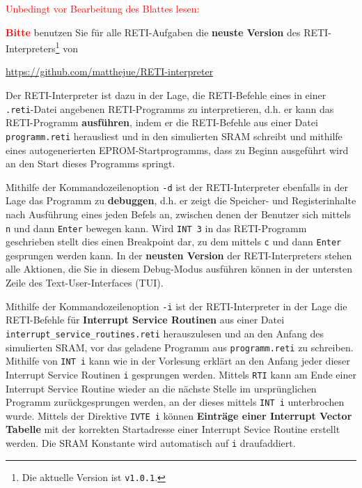 \documentclass{article}
\newenvironment{adjustedminipage}[1]
  {\vspace{0.15cm}\begin{minipage}{#1}}
  {\end{minipage}}
\begin{document}
\textcolor{red}{Unbedingt vor Bearbeitung des Blattes lesen:}

{\LARGE \textbf{\textcolor{red}{Bitte}}} benutzen Sie für alle RETI-Aufgaben die \textbf{neuste Version} des RETI-Interpreters\footnote{Die aktuelle Version ist \texttt{v1.0.1}.} von

\begin{center}
	\begin{adjustedminipage}{0.9\textwidth}
    \url{https://github.com/matthejue/RETI-interpreter}
	\end{adjustedminipage}
\end{center}

Der RETI-Interpreter ist dazu in der Lage, die RETI-Befehle eines in einer \verb|.reti|-Datei angebenen RETI-Programms zu interpretieren, d.h. er kann das RETI-Programm \textbf{ausführen}, indem er die RETI-Befehle aus einer Datei \verb|programm.reti| herausliest und in den simulierten SRAM schreibt und mithilfe eines autogenerierten EPROM-Startprogramms, dass zu Beginn ausgeführt wird an den Start dieses Programms springt.

Mithilfe der Kommandozeilenoption \verb|-d| ist der RETI-Interpreter ebenfalls in der Lage das Programm zu \textbf{debuggen}, d.h. er zeigt die Speicher- und Registerinhalte nach Ausführung eines jeden Befels an, zwischen denen der Benutzer sich mittels \verb|n| und dann \verb|Enter| bewegen kann. Wird \verb|INT 3| in das RETI-Programm geschrieben stellt dies einen Breakpoint dar, zu dem mittels \verb|c| und dann \verb|Enter| gesprungen werden kann. In der \textbf{neusten Version} der RETI-Interpreters stehen alle Aktionen, die Sie in diesem Debug-Modus ausführen können in der untersten Zeile des Text-User-Interfaces (TUI).

Mithilfe der Kommandozeilenoption \verb|-i| ist der RETI-Interpreter in der Lage die RETI-Befehle für \textbf{Interrupt Service Routinen} aus einer Datei \verb|interrupt_service_routines.reti| herauszulesen und an den Anfang des simulierten SRAM, vor das geladene Programm aus \verb|programm.reti| zu schreiben. Mithilfe von \verb|INT i| kann wie in der Vorlesung erklärt an den Anfang jeder dieser Interrupt Service Routinen \verb|i| gesprungen werden. Mittels \verb|RTI| kann am Ende einer Interrupt Service Routine wieder an die nächste Stelle im ursprünglichen Programm zurückgesprungen werden, an der dieses mittels \verb|INT i| unterbrochen wurde. Mittels der Direktive \verb|IVTE i| können \textbf{Einträge einer Interrupt Vector Tabelle} mit der korrekten Startadresse einer Interrupt Sevice Routine erstellt werden. Die SRAM Konstante wird automatisch auf \verb|i| draufaddiert.
\end{document}
